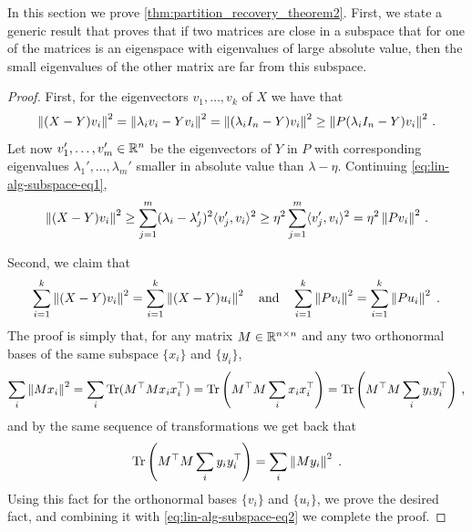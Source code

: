 In this section we prove \cref{thm:partition_recovery_theorem2}.
First, we state a generic result that proves that if two matrices are close in a subspace that for one of the matrices is an eigenspace with eigenvalues of large absolute value, then the small eigenvalues of the other matrix are far from this subspace.

\begin{proof}
First, for the eigenvectors $v_1, \ldots, v_{k}$ of $X$ we have that 
\begin{equation}
\label{eq:lin-alg-subspace-eq1}
\Norm{(X-Y)v_i}^2 = \Norm{\lambda_i v_i - Y v_i}^2 = \Norm{(\lambda_i I_n - Y) v_i}^2 \geq \Norm{P(\lambda_i I_n - Y) v_i}^2\,.
\end{equation}
Let now $v_1', \ldots, v_{m}' \in {\mathbb R}^n$ be the eigenvectors of $Y$ in $P$ with corresponding eigenvalues $\lambda_1', \ldots, \lambda_{m}'$ smaller in absolute value than $\lambda - \eta$.
Continuing \cref{eq:lin-alg-subspace-eq1},
\begin{equation}
\label{eq:lin-alg-subspace-eq2}
\Norm{(X-Y)v_i}^2 \geq \sum_{j=1}^{m} (\lambda_i - \lambda_j')^2 \langle v_j', v_i \rangle^2 \geq \eta^2 \sum_{j=1}^{m} \langle v_j', v_i \rangle^2 = \eta^2 \Norm{Pv_i}^2\,.
\end{equation}

Second, we claim that \[\sum_{i=1}^k \left\lVert(X-Y)v_i\right\rVert^2 = \sum_{i=1}^{k} \left\lVert(X-Y)u_i\right\rVert^2\quad\text{and}\quad \sum_{i=1}^k \left\lVert P v_i\right\rVert^2 = \sum_{i=1}^{k} \left\lVert P u_i\right\rVert^2\;.\]
The proof is simply that, for any matrix $M \in {\mathbb R}^{n \times n}$ and any two orthonormal bases of the same subspace $\{x_i\}$ and $\{y_i\}$,
\[\sum_{i} \left\lVert Mx_i\right\rVert^2 = \sum_{i} \mathrm{Tr}(M^\top M x_i x_i^\top) = \mathrm{Tr}\left(M^\top M \sum_{i} x_i x_i^\top\right) = \mathrm{Tr}\left(M^\top M \sum_{i} y_i y_i^\top\right)\,,\]
and by the same sequence of transformations we get back that \[\mathrm{Tr}\left(M^\top M \sum_{i} y_i y_i^\top\right) = \sum_{i} \left\lVert My_i\right\rVert^2\;.\] 
Using this fact for the orthonormal bases $\{v_i\}$ and $\{u_i\}$, we prove the desired fact, and combining it with \cref{eq:lin-alg-subspace-eq2} we complete the proof.
\end{proof}

